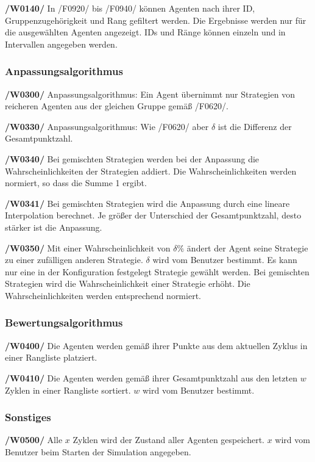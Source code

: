 \textbf{/W0140/}
In /F0920/ bis /F0940/ können Agenten nach ihrer ID, Gruppenzugehörigkeit und Rang gefiltert werden. Die Ergebnisse werden nur für die ausgewählten Agenten angezeigt. IDs und Ränge können einzeln und in Intervallen angegeben werden.

\subsubsection{Anpassungsalgorithmus}

\textbf{/W0300/}
Anpassungsalgorithmus: Ein Agent übernimmt nur Strategien von reicheren Agenten aus der gleichen Gruppe gemäß /F0620/.

\textbf{/W0330/}
Anpassungsalgorithmus: Wie /F0620/ aber $\delta$ ist die Differenz der Gesamtpunktzahl.

\textbf{/W0340/}
Bei gemischten Strategien werden bei der Anpassung die Wahrscheinlichkeiten der Strategien addiert. Die Wahrscheinlichkeiten werden normiert, so dass die Summe 1 ergibt.

{\color{red}
\textbf{/W0341/}
Bei gemischten Strategien wird die Anpassung durch eine lineare Interpolation berechnet. Je größer der Unterschied der Gesamtpunktzahl, desto stärker ist die Anpassung.
}

\textbf{/W0350/}
Mit einer Wahrscheinlichkeit von $\delta\%$ ändert der Agent seine Strategie zu einer zufälligen anderen Strategie. $\delta$ wird vom Benutzer bestimmt. Es kann nur eine in der Konfiguration festgelegt Strategie gewählt werden. Bei gemischten Strategien wird die Wahrscheinlichkeit einer Strategie erhöht. Die Wahrscheinlichkeiten werden entsprechend normiert.

\subsubsection{Bewertungsalgorithmus}

\textbf{/W0400/}
Die Agenten werden gemäß ihrer Punkte aus dem aktuellen Zyklus in einer Rangliste platziert.

\textbf{/W0410/}
Die Agenten werden gemäß ihrer Gesamtpunktzahl aus den letzten $w$ Zyklen in einer Rangliste sortiert. $w$ wird vom Benutzer bestimmt.

\subsubsection{Sonstiges}

\textbf{/W0500/}
Alle $x$ Zyklen wird der Zustand aller Agenten gespeichert. $x$ wird vom Benutzer beim Starten der Simulation angegeben.

